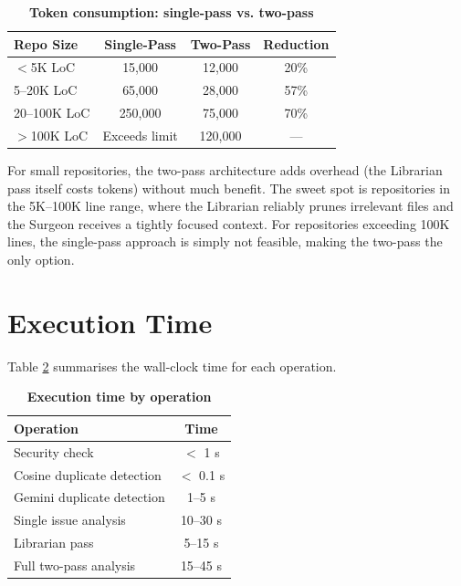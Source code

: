 \begin{table}[htb]
\centering
\renewcommand{\arraystretch}{1.3}
\setlength{\arrayrulewidth}{0.5mm}
\fontsize{10}{12}\selectfont
\caption[Token consumption: single-pass vs. two-pass]{\textbf{Token consumption: single-pass vs. two-pass}}
\vspace{2mm}
\label{tab:tokens}
\begin{tabular}{|p{3cm}|c|c|c|}
\hline
\textbf{Repo Size} & \textbf{Single-Pass} & \textbf{Two-Pass} & \textbf{Reduction} \\
\hline
$<$5K LoC & 15,000 & 12,000 & 20\% \\
\hline
5--20K LoC & 65,000 & 28,000 & 57\% \\
\hline
20--100K LoC & 250,000 & 75,000 & 70\% \\
\hline
$>$100K LoC & Exceeds limit & 120,000 & --- \\
\hline
\end{tabular}
\end{table}

For small repositories, the two-pass architecture adds overhead (the Librarian pass itself costs tokens) without much benefit. The sweet spot is repositories in the 5K--100K line range, where the Librarian reliably prunes irrelevant files and the Surgeon receives a tightly focused context. For repositories exceeding 100K lines, the single-pass approach is simply not feasible, making the two-pass the only option.

\section{Execution Time}

Table \ref{tab:timing} summarises the wall-clock time for each operation.

\begin{table}[htb]
\centering
\renewcommand{\arraystretch}{1.3}
\setlength{\arrayrulewidth}{0.5mm}
\fontsize{10}{12}\selectfont
\caption[Execution time by operation]{\textbf{Execution time by operation}}
\vspace{2mm}
\label{tab:timing}
\begin{tabular}{|p{5cm}|c|}
\hline
\textbf{Operation} & \textbf{Time} \\
\hline
Security check & $<$ 1 s \\
\hline
Cosine duplicate detection & $<$ 0.1 s \\
\hline
Gemini duplicate detection & 1--5 s \\
\hline
Single issue analysis & 10--30 s \\
\hline
Librarian pass & 5--15 s \\
\hline
Full two-pass analysis & 15--45 s \\
\hline
\end{tabular}
\end{table}

